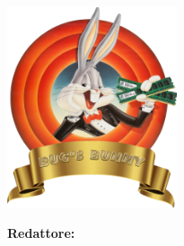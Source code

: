 \begin{titlepage}
    \begin{center}
        \makeatletter
        \vspace*{\fill}
        
        \includegraphics[width=5cm]{assets/logo}
        
        \Huge
        \textbf{\teamname}
        
        \vspace{3cm}
        
        \Huge
        \textbf{\@title}

        \Large
        \@date

        \vspace{3cm}
        
        \textbf{Redattore:} \@author
        
        \vfill
        \makeatother
    \end{center}
\end{titlepage}
